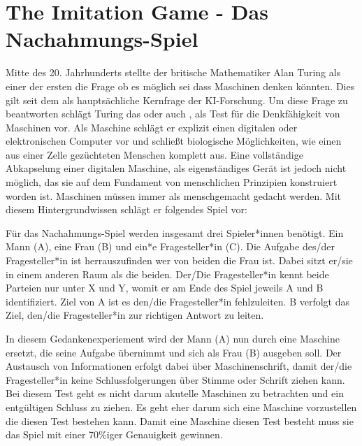 \documentclass[12pt,german,ngerman]{report}
\begin{document}
    \section{The Imitation Game - Das Nachahmungs-Spiel}
        Mitte des 20. Jahrhunderts stellte der britische Mathematiker Alan Turing als einer der ersten
        die Frage ob es möglich sei dass Maschinen denken könnten. Dies gilt seit dem als hauptsächliche
        Kernfrage der KI-Forschung. Um diese Frage zu beantworten schlägt Turing das  oder
        auch , als Test für die Denkfähigkeit von Maschinen vor. Als Maschine schlägt er
        explizit einen digitalen oder elektronischen Computer vor und schließt biologische Möglichkeiten,
        wie einen aus einer Zelle gezüchteten Menschen komplett aus.\cite[435]{turing1950computing}
        Eine vollständige Abkapselung einer digitalen Maschine, als eigenständiges Gerät ist jedoch nicht möglich, das sie auf dem
        Fundament von menschlichen Prinzipien konstruiert worden ist. Maschinen müssen immer als menschgemacht gedacht werden.
        Mit diesem Hintergrundwissen schlägt er folgendes Spiel vor:
        \begin{displayquote}
            Für das Nachahmungs-Spiel werden insgesamt drei Spieler*innen benötigt. Ein Mann (A), eine Frau (B) und ein*e
            Fragesteller*in (C). Die Aufgabe des/der Fragesteller*in ist herrauszufinden wer von beiden die Frau ist.
            Dabei sitzt er/sie in einem anderen Raum als die beiden. Der/Die Fragesteller*in kennt beide Parteien
            nur unter X und Y, womit er am Ende des Spiel jeweils A und B identifiziert. Ziel von A ist es den/die Fragesteller*in
            fehlzuleiten. B verfolgt das Ziel, den/die Fragesteller*in zur richtigen Antwort zu leiten.
            \cite[433]{turing1950computing}
        \end{displayquote}
        In diesem Gedankenexperiement wird der Mann (A) nun durch eine Maschine ersetzt, die seine Aufgabe übernimmt und
        sich als Frau (B) ausgeben soll. Der Austausch von Informationen erfolgt dabei über Maschinenschrift, damit
        der/die Fragesteller*in keine Schlussfolgerungen über Stimme oder Schrift ziehen kann.\cite[433]{turing1950computing}
        Bei diesem Test geht es nicht darum akutelle Maschinen zu betrachten und ein entgültigen Schluss zu ziehen. Es geht
        eher darum sich eine Maschine vorzustellen die diesen Test bestehen kann. Damit eine Maschine diesen Test besteht
        muss sie das Spiel mit einer 70\%iger Genauigkeit gewinnen.\cite[1]{oppy&dowe2020turingtest}
        
\end{document}
